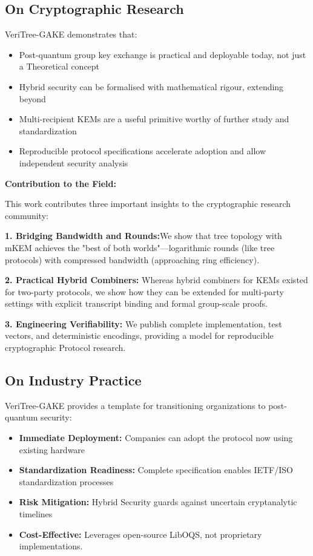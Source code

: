 \documentclass[12pt,a4paper]{report}
\begin{document}
\subsection{On Cryptographic Research}

VeriTree-GAKE demonstrates that:
\begin{itemize}
\item Post-quantum group key exchange is practical and deployable today, not just a Theoretical concept
\item Hybrid security can be formalised with mathematical rigour, extending beyond
\item Multi-recipient KEMs are a useful primitive worthy of further study and
standardization
\item Reproducible protocol specifications accelerate adoption and allow independent security analysis
\end{itemize}

\textbf{Contribution to the Field:}

This work contributes three important insights to the cryptographic research community:

\textbf{1. Bridging Bandwidth and Rounds:}We show that tree topology with mKEM
achieves the "best of both worlds"—logarithmic rounds (like tree protocols) with compressed bandwidth (approaching ring efficiency).

\textbf{2. Practical Hybrid Combiners:}  Whereas hybrid combiners for KEMs existed for two-party protocols, we show how they can be extended for multi-party settings with explicit
transcript binding and formal group-scale proofs.

\textbf{3. Engineering Verifiability:} We publish complete implementation, test vectors, and deterministic encodings, providing a model for reproducible cryptographic
Protocol research.

\subsection{On Industry Practice}

VeriTree-GAKE provides a template for transitioning organizations to post-quantum security:

\begin{itemize}
\item \textbf{Immediate Deployment:} Companies can adopt the protocol now using existing
hardware
\item \textbf{Standardization Readiness:} Complete specification enables IETF/ISO standardization processes
\item \textbf{Risk Mitigation:} Hybrid Security guards against uncertain cryptanalytic timelines
\item \textbf{Cost-Effective:} Leverages open-source LibOQS, not proprietary implementations.
\end{itemize}
\end{document}

